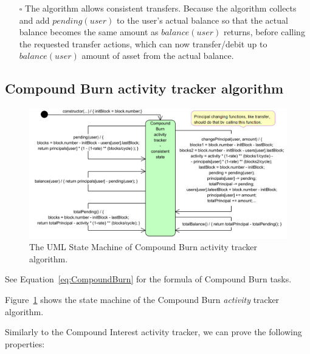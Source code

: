 \documentclass{article}
\begin{document}
\begin{itemize}
\begin{itemize}
    \item[$\square$] The algorithm allows consistent transfers. \newline    
    Because the algorithm collects and add $pending(user)$ to the user's actual balance 
    so that the actual balance becomes the same amount as $balance(user)$ returns, 
    before calling the requested transfer actions, which can now transfer/debit 
    up to $balance(user)$ amount of asset from the actual balance.

  \end{itemize}

\end{itemize}


\subsection{Compound Burn activity tracker algorithm}
\label{sec:CompoundBurnActivity}

\begin{figure}[H]
  \centering
  \includegraphics[width=5.3in]{images/CompoundBurnActivity.jpg}
  \caption{The UML State Machine of Compound Burn activity tracker algorithm.}
  \label{fig:CompoundBurnActivity}
\end{figure}
See Equation~\ref{eq:CompoundBurn} for the formula of Compound Burn tasks.

Figure~\ref{fig:CompoundBurnActivity} shows the state machine of the 
Compound Burn \textit{activity} tracker algorithm.

Similarly to the Compound Interest activity tracker, we can prove the following properties: \\
\end{document}
